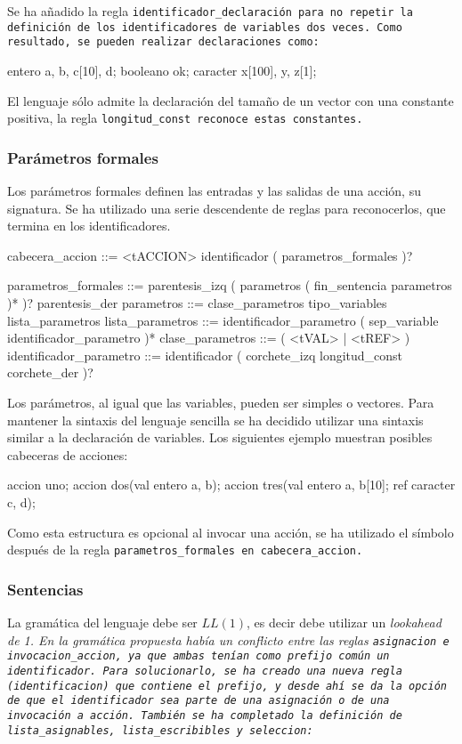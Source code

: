Se ha añadido la regla \tt{identificador\_declaración} para no repetir la definición de los identificadores de variables dos veces. Como resultado, se pueden realizar declaraciones como:

\begin{codigo}
entero a, b, c[10], d;
booleano ok;
caracter x[100], y, z[1];
\end{codigo}

El lenguaje sólo admite la declaración del tamaño de un vector con una constante positiva, la regla \tt{longitud\_const} reconoce estas constantes.

\subsubsection{Parámetros formales}
Los parámetros formales definen las entradas y las salidas de una acción, su signatura. Se ha utilizado una serie descendente de reglas para reconocerlos, que termina en los identificadores.

\begin{codigo}
cabecera_accion	::=	<tACCION> identificador ( parametros_formales )?

parametros_formales ::= parentesis_izq ( parametros ( fin_sentencia parametros )* )? parentesis_der
parametros ::= clase_parametros tipo_variables lista_parametros
lista_parametros ::= identificador_parametro ( sep_variable identificador_parametro )*
clase_parametros ::= ( <tVAL> | <tREF> )
identificador_parametro ::= identificador ( corchete_izq longitud_const corchete_der )?
\end{codigo}

Los parámetros, al igual que las variables, pueden ser simples o vectores. Para mantener la sintaxis del lenguaje sencilla se ha decidido utilizar una sintaxis similar a la declaración de variables. Los siguientes ejemplo muestran posibles cabeceras de acciones:

\begin{codigo}
accion uno;
accion dos(val entero a, b);
accion tres(val entero a, b[10]; ref caracter c, d);
\end{codigo}


Como esta estructura es opcional al invocar una acción, se ha utilizado el símbolo  después de la regla \tt{parametros\_formales} en \tt{cabecera\_accion}.

\subsubsection{Sentencias}
La gramática del lenguaje debe ser $LL(1)$, es decir debe utilizar un \it{lookahead} de 1. En la gramática propuesta había un conflicto entre las reglas \tt{asignacion} e \tt{invocacion\_accion}, ya que ambas tenían como prefijo común un identificador. Para solucionarlo, se ha creado una nueva regla (\tt{identificacion}) que contiene el prefijo, y desde ahí se da la opción de que el identificador sea parte de una asignación o de una invocación a acción. También se ha completado la definición de \tt{lista\_asignables}, \tt{lista\_escribibles} y \tt{seleccion}:

